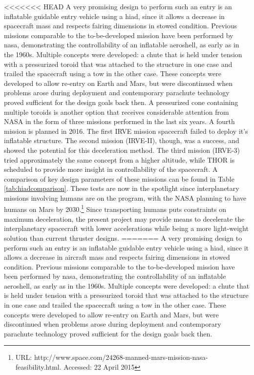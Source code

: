 <<<<<<< HEAD
A very promising design to perform such an entry is an inflatable guidable entry vehicle using a \gls{hiad}, since it allows a decrease in spacecraft mass and respects fairing dimensions in stowed condition. Previous missions comparable to the to-be-developed mission have been performed by \gls{nasa}, demonstrating the controllability of an inflatable aeroshell, as early as in the 1960s. Multiple concepts were developed: a chute that is held under tension with a pressurized toroid that was attached to the structure in one case and trailed the spacecraft using a tow in the other case. These concepts were developed to allow re-entry on Earth and Mars, but were discontinued when problems arose during deployment and contemporary parachute technology proved sufficient for the design goals back then. \citep{hiadhistory}
A pressurized cone containing multiple toroids is another option that receives considerable attention from NASA in the form of three missions performed in the last six years. A fourth mission is planned in 2016. The first IRVE mission spacecraft failed to deploy it's inflatable structure. The second mission (IRVE-II), though, was a success, and showed the potential for this deceleration method. The third mission (IRVE-3) tried approximately the same concept from a higher altitude, while THOR is scheduled to provide more insight in controllability of the spacecraft. \cite{irve2,irve3,thor} A comparison of key design parameters of these missions can be found in Table \ref{tab:hiadcomparison}.
These tests are now in the spotlight since interplanetary missions involving humans are on the program, with the NASA planning to have humans on Mars by 2030.\footnote{URL: http://www.space.com/24268-manned-mars-mission-nasa-feasibility.html. Accessed: 22 April 2015} Since transporting humans puts constraints on maximum deceleration, the present project may provide means to decelerate the interplanetary spacecraft with lower accelerations while being a more light-weight solution than current thruster designs.
=======
A very promising design to perform such an entry is an inflatable guidable entry vehicle using a \gls{hiad}, since it allows a decrease in aircraft mass and respects fairing dimensions in stowed condition. Previous missions comparable to the to-be-developed mission have been performed by \gls{nasa}, demonstrating the controllability of an inflatable aeroshell, as early as in the 1960s. Multiple concepts were developed: a chute that is held under tension with a pressurized toroid that was attached to the structure in one case and trailed the spacecraft using a tow in the other case. These concepts were developed to allow re-entry on Earth and Mars, but were discontinued when problems arose during deployment and contemporary parachute technology proved sufficient for the design goals back then. \citep{hiadhistory}
